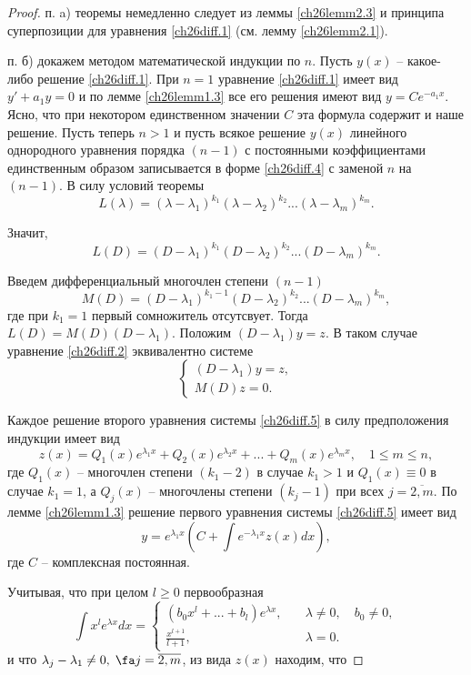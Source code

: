 \begin{proof}

п. a) теоремы немедленно следует из леммы \ref{ch26lemm2.3} и принципа суперпозиции для уравнения \eqref{ch26diff.1} (см. лемму \ref{ch26lemm2.1}).

п. б) докажем методом математической индукции по $n$. Пусть $y(x)$ -- какое-либо решение \eqref{ch26diff.1}. При $n=1$ уравнение \eqref{ch26diff.1} имеет вид $y'+a_1y=0$  и по лемме \ref{ch26lemm1.3} все его решения имеют вид $y=Ce^{-a_1x}$. Ясно, что при некотором единственном значении $C$ эта формула содержит и наше решение. Пусть теперь $n>1$  и пусть всякое решение $y(x)$ линейного однородного уравнения порядка $(n-1)$ с постоянными коэффициентами единственным образом записывается в форме \eqref{ch26diff.4} с заменой $n$ на $(n-1)$.
В силу условий теоремы 
$$
L(\lambda)=(\lambda-\lambda_1)^{k_1}(\lambda-\lambda_2)^{k_2}...(\lambda-\lambda_m)^{k_m}.
$$

Значит,
$$
L(D)=(D-\lambda_1)^{k_1}(D-\lambda_2)^{k_2}...(D-\lambda_m)^{k_m}.
$$

Введем дифференциальный многочлен степени $(n-1)$
$$
M(D)=(D-\lambda_1)^{k_1-1}(D-\lambda_2)^{k_2}...(D-\lambda_m)^{k_m},
$$
где при $k_1=1$ первый сомножитель отсутсвует. Тогда $L(D)=M(D)(D-\lambda_1)$. Положим $(D-\lambda_1)y=z$. В таком случае уравнение \eqref{ch26diff.2} эквивалентно системе
\begin{equation}\label{ch26diff.5}
\begin{cases}
(D-\lambda_1)y=z,\\M(D)z=0.
\end{cases}
\end{equation}

Каждое решение второго уравнения системы \eqref{ch26diff.5} в силу предположения индукции имеет вид
$$
z(x)=Q_1(x)e^{\lambda_1x}+Q_2(x)e^{\lambda_2x}+...+Q_m(x)e^{\lambda_mx},\quad 1\leq m\leq n,
$$
где $Q_1(x)$ -- многочлен степени $(k_1-2)$ в случае $k_1>1$ и $Q_1(x)\equiv 0$ в случае $k_1=1$, а $Q_j(x)$ -- многочлены степени $(k_j-1)$ при всех $j=\overline{2,m}$. По лемме \ref{ch26lemm1.3} решение первого уравнения системы \eqref{ch26diff.5} имеет вид
\begin{equation}\label{ch26diff.6}
y=e^{\lambda_1x}\left(C+\int e^{-\lambda_1x} z(x) dx\right),
\end{equation}
где $C$ -- комплексная постоянная.

Учитывая, что при целом $l\geq 0$ первообразная
$$
\int x^le^{\lambda x}dx = \begin{cases}
(b_0x^l+...+b_l)e^{\lambda x},\quad &\lambda \neq 0,\quad  b_0\neq 0,\\
\frac{x^{l+1}}{l+1},\quad &\lambda=0.
\end{cases}
$$
и что $\lambda_j-\lambda_1\neq 0,\; \fa j=\overline{2,m}$, из вида $z(x)$ находим, что


\end{proof}
